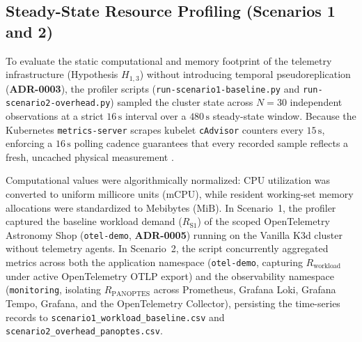 \subsection{Steady-State Resource Profiling (Scenarios 1 and 2)}
To evaluate the static computational and memory footprint of the telemetry infrastructure (Hypothesis $H_{1,3}$) without introducing temporal pseudoreplication (\textbf{ADR-0003}), the profiler scripts (\texttt{run-scenario1-baseline.py} and \texttt{run-scenario2-overhead.py}) sampled the cluster state across $N=30$ independent observations at a strict $16\,\text{s}$ interval over a $480\,\text{s}$ steady-state window. Because the Kubernetes \texttt{metrics-server} scrapes kubelet \texttt{cAdvisor} counters every $15\,\text{s}$, enforcing a $16\,\text{s}$ polling cadence guarantees that every recorded sample reflects a fresh, uncached physical measurement \cite{hurlbert_1984, jain_1991}.

Computational values were algorithmically normalized: CPU utilization was converted to uniform millicore units ($\text{mCPU}$), while resident working-set memory allocations were standardized to Mebibytes ($\text{MiB}$). In Scenario~1, the profiler captured the baseline workload demand ($R_{\text{S1}}$) of the scoped OpenTelemetry Astronomy Shop (\texttt{otel-demo}, \textbf{ADR-0005}) running on the Vanilla K3d cluster without telemetry agents. In Scenario~2, the script concurrently aggregated metrics across both the application namespace (\texttt{otel-demo}, capturing $R_{\text{workload}}$ under active OpenTelemetry OTLP export) and the observability namespace (\texttt{monitoring}, isolating $R_{\text{PANOPTES}}$ across Prometheus, Grafana Loki, Grafana Tempo, Grafana, and the OpenTelemetry Collector), persisting the time-series records to \texttt{scenario1\_workload\_baseline.csv} and \texttt{scenario2\_overhead\_panoptes.csv}.
